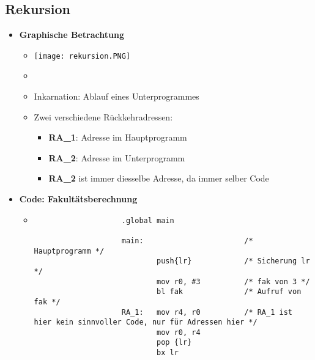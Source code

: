 \subsection{Rekursion}
    \begin{itemize}
        \item \textbf{Graphische Betrachtung}
            \begin{itemize}
                \item[] \texttt{[image: rekursion.PNG]}
                \item[] 
                \item Inkarnation: Ablauf eines Unterprogrammes
                \item Zwei verschiedene Rückkehradressen:
                    \begin{itemize}
                        \item \textbf{RA\_1}: Adresse im Hauptprogramm
                        \item \textbf{RA\_2}: Adresse im Unterprogramm
                        \item \textbf{RA\_2} ist immer diesselbe Adresse, da immer selber Code
                    \end{itemize} 
            \end{itemize}

        \item \textbf{Code: Fakultätsberechnung}
            \begin{itemize}
                \item[]
                    \begin{verbatim}
                    .global main

                    main:                       /* Hauptprogramm */
                            push{lr}            /* Sicherung lr */
                            mov r0, #3          /* fak von 3 */
                            bl fak              /* Aufruf von fak */
                    RA_1:   mov r4, r0          /* RA_1 ist hier kein sinnvoller Code, nur für Adressen hier */
                            mov r0, r4
                            pop {lr}
                            bx lr
                    

\end{verbatim}
\end{itemize}
\end{itemize}
